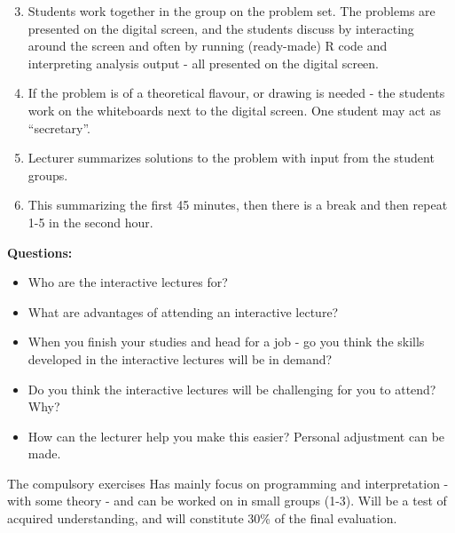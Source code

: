 \documentclass[
  ignorenonframetext,
]{beamer}
\providecommand{\tightlist}{%
  \setlength{\itemsep}{0pt}\setlength{\parskip}{0pt}}
\begin{document}
\begin{frame}
\begin{enumerate}
\setcounter{enumi}{2}
\item
  Students work together in the group on the problem set. The problems
  are presented on the digital screen, and the students discuss by
  interacting around the screen and often by running (ready-made) R code
  and interpreting analysis output - all presented on the digital
  screen.
\item
  If the problem is of a theoretical flavour, or drawing is needed - the
  students work on the whiteboards next to the digital screen. One
  student may act as ``secretary''.
\end{enumerate}
\end{frame}

\begin{frame}
\begin{enumerate}
\setcounter{enumi}{4}
\item
  Lecturer summarizes solutions to the problem with input from the
  student groups.
\item
  This summarizing the first 45 minutes, then there is a break and then
  repeat 1-5 in the second hour.
\end{enumerate}
\end{frame}

\begin{frame}
\textbf{Questions:}

\begin{itemize}
\tightlist
\item
  Who are the interactive lectures for?
\item
  What are advantages of attending an interactive lecture?
\item
  When you finish your studies and head for a job - go you think the
  skills developed in the interactive lectures will be in demand?
\item
  Do you think the interactive lectures will be challenging for you to
  attend? Why?
\item
  How can the lecturer help you make this easier? Personal adjustment
  can be made.
\end{itemize}
\end{frame}

\begin{frame}
\begin{block}{The compulsory exercises}
\protect\hypertarget{the-compulsory-exercises}{}
Has mainly focus on programming and interpretation - with some theory -
and can be worked on in small groups (1-3). Will be a test of acquired
understanding, and will constitute 30\% of the final evaluation.
\end{block}
\end{frame}
\end{document}
